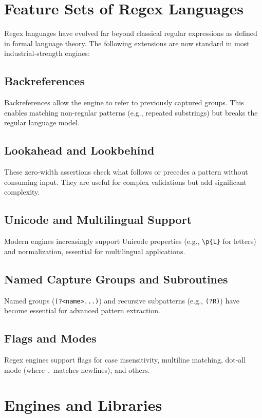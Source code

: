 
\section{Feature Sets of Regex Languages}
Regex languages have evolved far beyond classical regular expressions as defined in formal language theory. The following extensions are now standard in most industrial-strength engines:

\subsection{Backreferences}
Backreferences allow the engine to refer to previously captured groups. This enables matching non-regular patterns (e.g., repeated substrings) but breaks the regular language model.

\subsection{Lookahead and Lookbehind}
These zero-width assertions check what follows or precedes a pattern without consuming input. They are useful for complex validations but add significant complexity.

\subsection{Unicode and Multilingual Support}
Modern engines increasingly support Unicode properties (e.g., \verb|\p{L}| for letters) and normalization, essential for multilingual applications.

\subsection{Named Capture Groups and Subroutines}
Named groups (\verb|(?<name>...)|) and recursive subpatterns (e.g., \verb|(?R)|) have become essential for advanced pattern extraction.

\subsection{Flags and Modes}
Regex engines support flags for case insensitivity, multiline matching, dot-all mode (where \verb|.| matches newlines), and others.

\section{Engines and Libraries}
